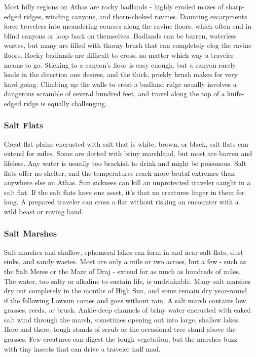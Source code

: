 \begin{multicols}{2}
Most hilly regions on Athas are rocky badlands - highly eroded mazes of
sharp-edged ridges, winding canyons, and thorn-choked ravines. Daunting
escarpments force travelers into meandering courses along the ravine
floors, which often end in blind canyons or loop back on themselves.
Badlands can be barren, waterless wastes, but many are filled with thorny brush
that can completely clog the ravine floors. Rocky badlands are difficult to cross,
no matter which way a traveler means to go. Sticking to a canyon's floor is easy
enough, but a canyon rarely leads in the direction one desires, and the thick,
prickly brush makes for very hard going. Climbing up the walls to crest a badland
ridge usually involves a dangerous scramble of several hundred feet, and travel
along the top of a knife-edged ridge is equally challenging.

\subsubsection{Salt Flats}

Great flat plains encrusted with salt that is white, brown, or black, salt flats
can extend for miles. Some are dotted with briny marshland, but most are barren
and lifeless. Any water is usually too brackish to drink and might be poisonous.
Salt flats offer no shelter, and the temperatures reach more brutal extremes
than anywhere else on Athas. Sun sickness can kill an unprotected traveler
caught in a salt flat. If the salt flats have one asset, it's that no creatures
linger in them for long. A prepared traveler can cross a flat without risking
an encounter with a wild beast or roving band.

\subsubsection{Salt Marshes}

Salt marshes and shallow, ephemeral lakes can form in and near salt flats, dust
sinks, and sandy wastes. Most are only a mile or two across, but a few - such as
the Salt Meres or the Maze of Draj - extend for as much as hundreds of miles.
The water, too salty or alkaline to sustain life, is undrinkable. Many salt
marshes dry out completely in the months of High Sun, and some remain dry
year-round if the following Lowsun comes and goes without rain. A salt marsh
contains low grasses, reeds, or brush. Ankle-deep channels of briny water
encrusted with caked salt wind through the marsh, sometimes opening out into
large, shallow lakes. Here and there, tough stands of scrub or the occasional
tree stand above the grasses. Few creatures can digest the tough vegetation,
     but the marshes buzz with tiny insects that can drive a traveler half mad.


\end{multicols}
